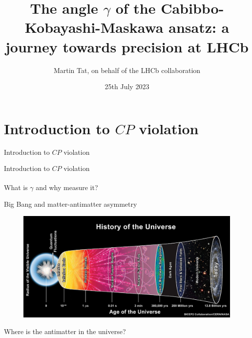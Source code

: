 \documentclass[dvipsnames]{beamer}
\title[CERN LHC seminar]{The angle $\gamma$ of the Cabibbo-Kobayashi-Maskawa ansatz: a journey towards precision at LHCb}
\author[Martin Tat]{Martin Tat, on behalf of the LHCb collaboration}
\institute[University of Oxford]{\normalsize University of Oxford\\ \vspace{0.3cm}\normalsize CERN LHC seminar}
\date{25th July 2023}
\begin{document}
\begin{frame}
  \titlepage
\end{frame}


\section{Introduction to \texorpdfstring{$C\!P$}{CP} violation}
\begin{frame}{Introduction to $C\!P$ violation}
  \begin{center}
    {\huge Introduction to $C\!P$ violation} \\~\\
    {\large What is $\gamma$ and why measure it?}
  \end{center}
\end{frame}

\begin{frame}{Big Bang and matter-antimatter asymmetry}
  \begin{figure}
    \includegraphics[height=5.5cm]{Plots/BigBangHistory.jpg}
  \end{figure}
  \begin{center}
    \Large Where is the antimatter in the universe?\phantom{yq}
  \end{center}
\end{frame}
\end{document}
